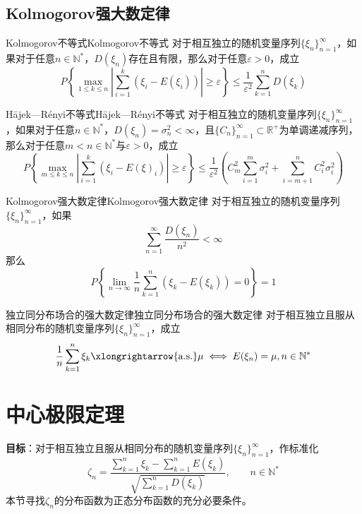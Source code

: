 \documentclass[lang = cn, scheme = chinese, thmcnt = section]{elegantbook}
\newcommand{\N}{\mathbb{N}}            %
\newcommand{\R}{\mathbb{R}}            %
\newcommand{\sub}{\subset}             %
\newcommand{\dis}{\displaystyle}
\begin{document}
\subsection{Kolmogorov强大数定律}

\begin{theorem}{Kolmogorov不等式}{Kolmogorov不等式}
	对于相互独立的随机变量序列$\{ \xi_n \}_{n=1}^{\infty}$，如果对于任意$n\in\N^*$，$D(\xi_n)$存在且有限，那么对于任意$\varepsilon>0$，成立
	$$
	P\left\{\max_{1\le k\le n}{\left|\sum_{i=1}^{k}{(\xi_i-E(\xi_i))}\right|}\ge\varepsilon\right\}\le\frac{1}{\varepsilon^2}\sum_{k=1}^{n}{D(\xi_k)}
	$$
\end{theorem}

\begin{theorem}{Hājek—Rényi不等式}{Hājek—Rényi不等式}
	对于相互独立的随机变量序列$\{ \xi_n \}_{n=1}^{\infty}$，如果对于任意$n\in\N^*$，$D(\xi_n)=\sigma_n^2<\infty$，且$\{C_n\}_{n=1}^{\infty}\sub\R^+$为单调递减序列，那么对于任意$m<n\in\N^*$与$\varepsilon>0$，成立
	$$
	P\left\{\max_{m\le k\le n}{\left|\sum_{i=1}^{k}{(\xi_i-E(\xi)_i)}\right|}\ge\varepsilon\right\}\le\frac{1}{\varepsilon^2}\left(C_m^2\sum_{i=1}^{m}{\sigma_i^2}+\sum_{i=m+1}^{n}{C_i^2\sigma_i^2}\right)
	$$
\end{theorem}

\begin{theorem}{Kolmogorov强大数定律}{Kolmogorov强大数定律}
	对于相互独立的随机变量序列$\{ \xi_n \}_{n=1}^{\infty}$，如果%
	$$
	\sum_{n=1}^{\infty}{\frac{D(\xi_n)}{n^2}}<\infty
	$$
	那么%
	$$
	P\left\{\lim_{n\to\infty}{\frac{1}{n}{\sum_{k=1}^{n}{(\xi_k-E(\xi_k))}}}=0\right\}=1
	$$
\end{theorem}

\begin{theorem}{独立同分布场合的强大数定律}{独立同分布场合的强大数定律}
	对于相互独立且服从相同分布的随机变量序列$\{ \xi_n \}_{n=1}^{\infty}$，成立%
	$$
	\frac{1}{n}\sum_{k=1}^{n}{\xi_k}\xlongrightarrow{\mathrm{a.s.}}\mu\iff
	E(\xi_n)=\mu,n\in\N^*
	$$
\end{theorem}

\section{中心极限定理}

\textbf{目标}：对于相互独立且服从相同分布的随机变量序列$\{ \xi_n \}_{n=1}^{\infty}$，作标准化
$$
\zeta_n=\frac{\dis\sum_{k=1}^{n}{\xi_k}-\sum_{k=1}^{n}{E(\xi_k)}}{\dis\sqrt{\sum_{k=1}^{n}{D(\xi_k)}}},\qquad n\in\N^*
$$
本节寻找$\zeta_n$的分布函数为正态分布函数的充分必要条件。
\end{document}
